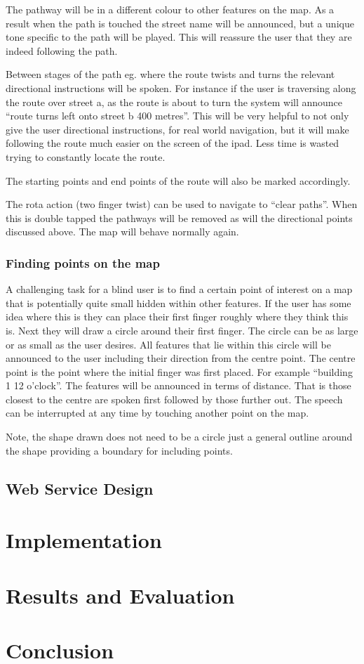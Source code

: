 \documentclass[11pt,twoside,a4paper]{article}
\begin{document}
The pathway will be in a different colour to other features on the
map. As a result when the path is touched the street name will be
announced, but a unique tone specific to the path will be played. This
will reassure the user that they are indeed following the path.

Between stages of the path eg. where the route twists and turns the
relevant directional instructions will be spoken. For instance if the
user is traversing along the route over street a, as the route is about
to turn the system will announce ``route turns left onto street b 400
metres''. This will be very helpful to not only give the user
directional instructions, for real world navigation, but it will make
following the route much easier on the screen of the ipad. Less time is
wasted trying to constantly locate the route.

The starting points and end points of the route will also be marked
accordingly.

The rota action (two finger twist) can be used to navigate to ``clear
paths''. When this is double tapped the pathways will be removed as will
the directional points discussed above. The map will behave normally
again.

\subsubsection{Finding points on the map}

A challenging task for a blind user is to find a certain point of
interest on a map that is potentially quite small hidden within other
features. If the user has some idea where this is they can place their
first finger roughly where they think this is. Next they will draw a
circle around their first finger. The circle can be as large or as small
as the user desires. All features that lie within this circle will be
announced to the user including their direction from the centre
point. The centre point is the point where the initial finger was first
placed. For example ``building 1 12 o'clock''. The features will be
announced in terms of distance. That is those closest to the centre are
spoken first followed by those further out. The speech can be
interrupted at any time by touching another point on the map.

Note, the shape drawn does not need to be a circle just a general
outline around the shape providing a boundary for including points.

\subsection{Web Service Design}

\section{Implementation}

\section{Results and Evaluation}

\section{Conclusion}


\end{document}
